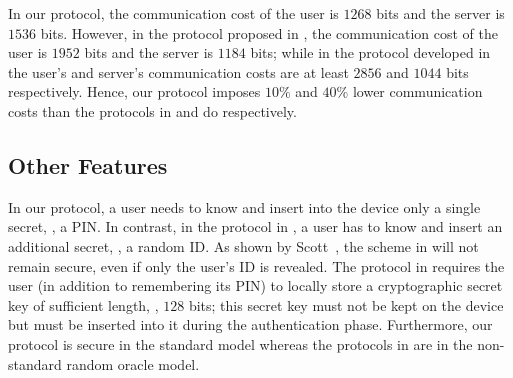 In our protocol, the communication cost of the user is $1268$ bits and the server is $1536$ bits. However, in the protocol proposed in \cite{WangW18},  the communication cost of the user is $1952$ bits and the server is  $1184$ bits; while in the protocol developed in \cite{JareckiJKSS21} the user's and server's communication costs are at least $2856$ and $1044$ bits respectively. Hence, our protocol imposes $10\%$ and $40\%$ lower communication costs than the protocols in \cite{WangW18} and \cite{JareckiJKSS21} do respectively.


\subsection{Other Features}
 In our protocol, a user needs to know and insert into the device only a single secret, \ie, a  PIN. In contrast, in the protocol in \cite{WangW18}, a user has to know and insert an additional secret, \ie, a random ID. As shown by Scott~\cite{Scott12a}, the scheme in \cite{WangW18} will not remain secure, even if only the user's ID is revealed. The protocol in \cite{JareckiJKSS21} requires the user (in addition to remembering its PIN) to locally store a cryptographic secret key of sufficient length, \eg, $128$ bits; this secret key must not be kept on the device but must be inserted into it during the authentication phase. 
 Furthermore, our protocol is secure in the standard model whereas the protocols in \cite{WangW18,JareckiJKSS21} are in the non-standard random oracle model. 

